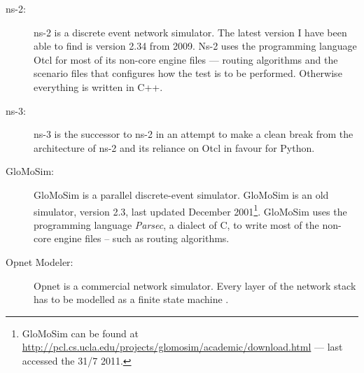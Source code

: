 \begin{description}
\item[ns-2:] ns-2 is a discrete event network simulator. The latest version I have been able to find is version 2.34 from 2009. Ns-2 uses the programming language Otcl for most of its non-core engine files --- routing algorithms and the scenario files that configures how the test is to be performed. Otherwise everything is written in C++.
\item[ns-3:] ns-3 is the successor to ns-2 in an attempt to make a clean break from the architecture of ns-2 and its reliance on Otcl in favour for Python.
\item[GloMoSim:] GloMoSim is a parallel discrete-event simulator. GloMoSim is an old simulator, version 2.3, last updated December 2001\footnote{GloMoSim can be found at \url{http://pcl.cs.ucla.edu/projects/glomosim/academic/download.html} --- last accessed the 31/7 2011.}. GloMoSim uses the programming language \emph{Parsec}, a dialect of C, to write most of the non-core engine files -- such as routing algorithms. 
\item[Opnet Modeler:] Opnet is a commercial network simulator. Every layer of the network stack has to be modelled as a finite state machine \cite{MANcom}. 
\end{description}

